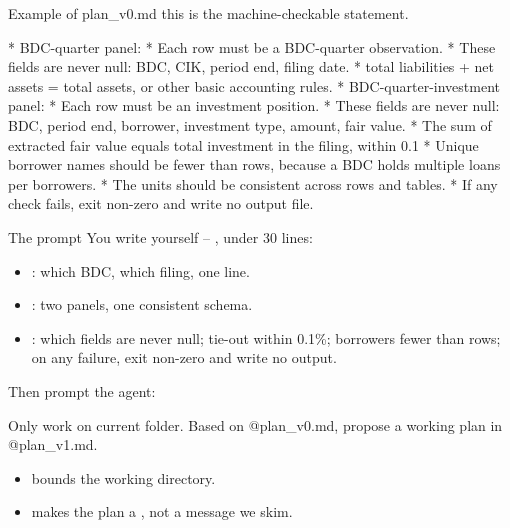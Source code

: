 \begin{frame}[fragile]{Example of plan\_v0.md}
 this is the machine-checkable statement.
\begin{prompt}
* BDC-quarter panel:
    * Each row must be a BDC-quarter observation.
    * These fields are never null: BDC, CIK, period end, filing date.
    * total liabilities + net assets = total assets, or other basic accounting rules.
* BDC-quarter-investment panel:
    * Each row must be an investment position.
    * These fields are never null: BDC, period end, borrower, investment type, amount, fair value.
    * The sum of extracted fair value equals total investment in the filing, within 0.1%
    * Unique borrower names should be fewer than rows, because a BDC holds multiple loans per borrowers.
* The units should be consistent across rows and tables.
* If any check fails, exit non-zero and write no output file. 
\end{prompt}
\end{frame}

\begin{frame}[fragile]{The prompt}
You write  yourself -- , under 30 lines:
\begin{itemize}\small
    \item {}: which BDC, which filing, one line.
    \item {}: two panels, one consistent schema.
    \item {}: which fields are never null; tie-out within
          0.1\%; borrowers fewer than rows; on any failure, exit non-zero and
          write no output.
\end{itemize}
\vs
Then prompt the agent:
\begin{prompt}
Only work on current folder. Based on @plan_v0.md, propose a working plan in @plan_v1.md.
\end{prompt}
\begin{itemize}
  \item {} bounds the working directory.
  \item {} makes the plan a ,
        not a message we skim.
\end{itemize}
\end{frame}

